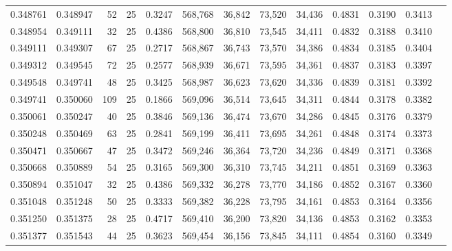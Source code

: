 \begin{tabular}{rrrrrrrrrrrrr}
0.348761 & 0.348947 &    52 &  25 &                                     0.3247 & 568,768 &  36,842 &  73,520 &  34,436 & 0.4831 & 0.3190 & 0.3413 \\
0.348954 & 0.349111 &    32 &  25 &                                     0.4386 & 568,800 &  36,810 &  73,545 &  34,411 & 0.4832 & 0.3188 & 0.3410 \\
0.349111 & 0.349307 &    67 &  25 &                                     0.2717 & 568,867 &  36,743 &  73,570 &  34,386 & 0.4834 & 0.3185 & 0.3404 \\
0.349312 & 0.349545 &    72 &  25 &                                     0.2577 & 568,939 &  36,671 &  73,595 &  34,361 & 0.4837 & 0.3183 & 0.3397 \\
0.349548 & 0.349741 &    48 &  25 &                                     0.3425 & 568,987 &  36,623 &  73,620 &  34,336 & 0.4839 & 0.3181 & 0.3392 \\
0.349741 & 0.350060 &   109 &  25 &                                     0.1866 & 569,096 &  36,514 &  73,645 &  34,311 & 0.4844 & 0.3178 & 0.3382 \\
0.350061 & 0.350247 &    40 &  25 &                                     0.3846 & 569,136 &  36,474 &  73,670 &  34,286 & 0.4845 & 0.3176 & 0.3379 \\
0.350248 & 0.350469 &    63 &  25 &                                     0.2841 & 569,199 &  36,411 &  73,695 &  34,261 & 0.4848 & 0.3174 & 0.3373 \\
0.350471 & 0.350667 &    47 &  25 &                                     0.3472 & 569,246 &  36,364 &  73,720 &  34,236 & 0.4849 & 0.3171 & 0.3368 \\
0.350668 & 0.350889 &    54 &  25 &                                     0.3165 & 569,300 &  36,310 &  73,745 &  34,211 & 0.4851 & 0.3169 & 0.3363 \\
0.350894 & 0.351047 &    32 &  25 &                                     0.4386 & 569,332 &  36,278 &  73,770 &  34,186 & 0.4852 & 0.3167 & 0.3360 \\
0.351048 & 0.351248 &    50 &  25 &                                     0.3333 & 569,382 &  36,228 &  73,795 &  34,161 & 0.4853 & 0.3164 & 0.3356 \\
0.351250 & 0.351375 &    28 &  25 &                                     0.4717 & 569,410 &  36,200 &  73,820 &  34,136 & 0.4853 & 0.3162 & 0.3353 \\
0.351377 & 0.351543 &    44 &  25 &                                     0.3623 & 569,454 &  36,156 &  73,845 &  34,111 & 0.4854 & 0.3160 & 0.3349 \\

\end{tabular}
